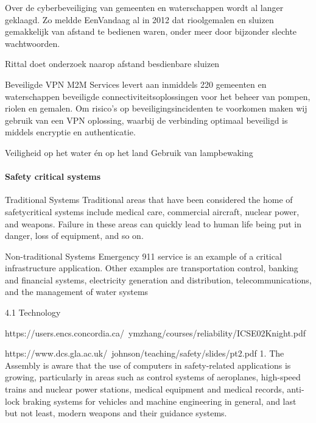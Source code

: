 \cite{cybersecWaterwerk}
Over de cyberbeveiliging van gemeenten en waterschappen wordt al langer geklaagd. Zo meldde EenVandaag al in 2012 dat rioolgemalen en sluizen gemakkelijk van afstand te bedienen waren, onder meer door bijzonder slechte wachtwoorden.

\cite{cybersecWaterschappen}
Rittal doet onderzoek naarop afstand besdienbare sluizen

\cite{cybersecZuidHolland}
Beveiligde VPN
M2M Services levert aan inmiddels 220 gemeenten en waterschappen beveiligde connectiviteitsoplossingen voor het beheer van pompen, riolen en gemalen. Om risico’s op beveiligingsincidenten te voorkomen maken wij gebruik van een VPN oplossing, waarbij de verbinding optimaal beveiligd is middels encryptie en authenticatie.

\cite{waterwerkNED}
Veiligheid op het water én op het land
Gebruik van lampbewaking 

\cite{veiligheidwaterland} 





\paragraph{Safety critical systems}

\cite{winceckCriticalToSafety}
\cite{chambersHazardAnalysisSCS}
\cite{rslater1998SCSAnalysis}
Traditional Systems
Traditional areas that have been considered the home of safetycritical systems include medical care, commercial aircraft, nuclear
power, and weapons. Failure in these areas can quickly lead to
human life being put in danger, loss of equipment, and so on.

Non-traditional Systems
Emergency 911 service is an example of a critical infrastructure
application. Other examples are transportation control, banking
and financial systems, electricity generation and distribution, telecommunications, and the management of water systems

4.1 Technology

https://users.encs.concordia.ca/~ymzhang/courses/reliability/ICSE02Knight.pdf
\cite{knightchallengessafetyCritical}

https://www.dcs.gla.ac.uk/~johnson/teaching/safety/slides/pt2.pdf
\cite{johnson2006devsafetycritical}
\cite{daucriticalsafetyconsider}
\cite{fallsafedesign}
\cite{arForce2015VerificationExpectations}
\cite{nebulaassessment}
\cite{lalaArchitecturalPrinciples}
\cite{mitNotesSafetyCritical}
\cite{britishColumbia2020GuideSafetyCritical}
1.       The Assembly is aware that the use of computers in safety-related applications is growing, particularly in areas such as control systems of aeroplanes, high-speed trains and nuclear power stations, medical equipment and medical records, anti-lock braking systems for vehicles and machine engineering in general, and last but not least, modern weapons and their guidance systems.

